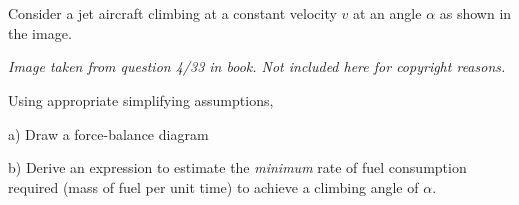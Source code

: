 \section{}
Consider a jet aircraft climbing at a constant velocity $v$ at an angle $\alpha$ as shown in the image.

\emph{Image taken from question 4/33 in book. Not included here for copyright reasons.}

Using appropriate simplifying assumptions,

a) Draw a force-balance diagram

b) Derive an expression to estimate the \emph{minimum} rate of fuel consumption required (mass of fuel per unit time) to achieve a climbing angle of $\alpha$.
